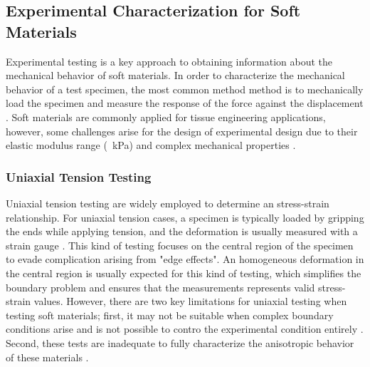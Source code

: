 \subsection{Experimental Characterization for Soft Materials}
\label{subsection:experimentalcharacterization}
Experimental testing is a key approach to obtaining information about the mechanical behavior of soft materials.
In order to characterize the mechanical behavior of a test specimen, the most common method
method is to mechanically load the specimen and measure the response of the force against 
the displacement \cite{Bergström2015}. Soft materials are commonly applied 
for tissue engineering applications, however, some challenges arise for the 
design of experimental design due to their elastic modulus range (\SI{}{\kilo \pascal}) and complex
mechanical properties \cite{Liu2009}.\\



\subsubsection*{Uniaxial Tension Testing}

Uniaxial tension testing are widely employed to determine an stress-strain relationship.
For uniaxial tension cases, a specimen is typically loaded by gripping the ends while applying 
tension, and the deformation is usually measured with a strain gauge \cite{Bergström2015}.
This kind of testing focuses on the central region of the specimen to evade complication arising from 
"edge effects". An homogeneous deformation in the central region is usually expected for this kind of testing, 
which simplifies the boundary problem and ensures that the measurements represents valid stress-strain values.
However, there are two key limitations for uniaxial testing when testing soft materials; first, 
it may not be suitable when complex boundary conditions arise and is not possible to contro the 
experimental condition entirely \cite{Seshaiyer2003}. Second, these tests are inadequate to 
fully characterize the anisotropic behavior of these materials \cite{Cox2006}.\\

